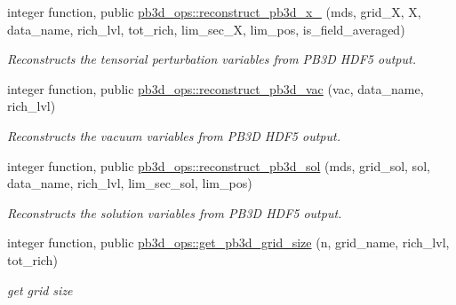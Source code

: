 \begin{DoxyCompactItemize}
integer function, public \hyperlink{namespacepb3d__ops_aff64b6722845a07139e2832c0be36145}{pb3d\+\_\+ops\+::reconstruct\+\_\+pb3d\+\_\+x\+\_} (mds, grid\+\_\+X, X, data\+\_\+name, rich\+\_\+lvl, tot\+\_\+rich, lim\+\_\+sec\+\_\+X, lim\+\_\+pos, is\+\_\+field\+\_\+averaged)
\begin{DoxyCompactList}\small\item\em Reconstructs the tensorial perturbation variables from P\+B3D H\+D\+F5 output. \end{DoxyCompactList}\item 
integer function, public \hyperlink{namespacepb3d__ops_a281c496a42c4ea46606e929e10d51582}{pb3d\+\_\+ops\+::reconstruct\+\_\+pb3d\+\_\+vac} (vac, data\+\_\+name, rich\+\_\+lvl)
\begin{DoxyCompactList}\small\item\em Reconstructs the vacuum variables from P\+B3D H\+D\+F5 output. \end{DoxyCompactList}\item 
integer function, public \hyperlink{namespacepb3d__ops_ae7afc544227f34f2877eb5a14d620823}{pb3d\+\_\+ops\+::reconstruct\+\_\+pb3d\+\_\+sol} (mds, grid\+\_\+sol, sol, data\+\_\+name, rich\+\_\+lvl, lim\+\_\+sec\+\_\+sol, lim\+\_\+pos)
\begin{DoxyCompactList}\small\item\em Reconstructs the solution variables from P\+B3D H\+D\+F5 output. \end{DoxyCompactList}\item 
integer function, public \hyperlink{namespacepb3d__ops_a528ae2857b7272d29d96f66ee60980a7}{pb3d\+\_\+ops\+::get\+\_\+pb3d\+\_\+grid\+\_\+size} (n, grid\+\_\+name, rich\+\_\+lvl, tot\+\_\+rich)
\begin{DoxyCompactList}\small\item\em get grid size \end{DoxyCompactList}\end{DoxyCompactItemize}
